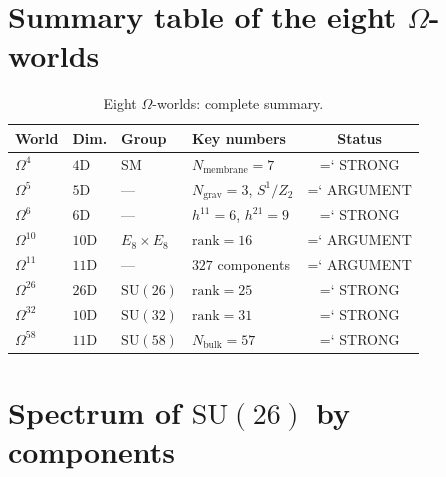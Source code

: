 \documentclass[11pt,a4paper]{article}
\newcommand{\SU}{\mathrm{SU}}
\newcommand{\Om}{\Omega^4}
\newcommand{\Omf}{\Omega^5}
\newcommand{\Oms}{\Omega^6}
\newcommand{\Omt}{\Omega^{10}}
\newcommand{\Ome}{\Omega^{11}}
\newcommand{\Omtw}{\Omega^{26}}
\newcommand{\Omth}{\Omega^{32}}
\newcommand{\Omfi}{\Omega^{58}}
\newcommand{\Nbulk}{N_{\text{bulk}}}
\newcommand{\Nmembrane}{N_{\text{membrane}}}
\renewcommand{\texttt}[1]{{\ttfamily\hyphenchar\font=`\- #1}}
\theoremstyle{definition}
\begin{document}
\appendix

\section{Summary table of the eight $\Omega$-worlds}
\label{app:eight-worlds}

\begin{table}[htbp]
\centering
\caption{Eight $\Omega$-worlds: complete summary.}
\label{tab:app-eight-worlds}
\begin{tabular}{llllc}
\toprule
World & Dim. & Group & Key numbers & Status \\
\midrule
$\Om$ & $4$D & SM & $\Nmembrane = 7$ & \texttt{STRONG} \\
$\Omf$ & $5$D & --- & $N_{\text{grav}} = 3$, $S^1/Z_2$ & \texttt{ARGUMENT} \\
$\Oms$ & $6$D & --- & $h^{11}=6$, $h^{21}=9$ & \texttt{STRONG} \\
$\Omt$ & $10$D & $E_8 \times E_8$ & $\mathrm{rank} = 16$ & \texttt{ARGUMENT} \\
$\Ome$ & $11$D & --- & $327$ components & \texttt{ARGUMENT} \\
$\Omtw$ & $26$D & $\SU(26)$ & $\mathrm{rank} = 25$ & \texttt{STRONG} \\
$\Omth$ & $10$D & $\SU(32)$ & $\mathrm{rank} = 31$ & \texttt{STRONG} \\
$\Omfi$ & $11$D & $\SU(58)$ & $\Nbulk = 57$ & \texttt{STRONG} \\
\bottomrule
\end{tabular}
\end{table}

\section{Spectrum of $\SU(26)$ by components}
\label{app:su26-spectrum}
\end{document}
